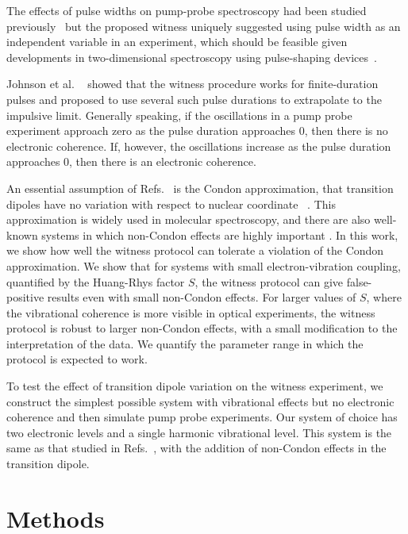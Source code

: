 The effects of pulse widths on pump-probe spectroscopy had been studied previously~\cite{pulseWidth} but the proposed witness uniquely suggested using pulse width as an independent variable in an experiment, which should be feasible given developments in two-dimensional spectroscopy using pulse-shaping devices~\cite{pulse1,pulse2}.

Johnson et al.  ~\cite{allanWitness} showed that the witness procedure works for finite-duration pulses and proposed to use several such pulse durations to extrapolate to the impulsive limit. Generally speaking, if the oscillations in a pump probe experiment approach zero as the pulse duration approaches 0, then there is no electronic coherence.  If, however, the oscillations increase as the pulse duration approaches 0, then there is an electronic coherence.

An essential assumption of Refs.~\cite{witness,allanWitness} is the Condon approximation, that transition dipoles have no variation with respect to nuclear coordinate ~\cite{Condon,FranckCondon}. This approximation is widely used in molecular spectroscopy, and there are also well-known systems in which non-Condon effects are highly important \cite{photosyntheticKappa,MavrosNonCondon,hellerGraphene,Hockett2011}. In this work, we show how well the witness protocol can tolerate a violation of the Condon approximation. We show that for systems with small electron-vibration coupling, quantified by the Huang-Rhys factor $S$, the witness protocol can give false-positive results even with small non-Condon effects. For larger values of $S$, where the vibrational coherence is more visible in optical experiments, the witness protocol is robust to larger non-Condon effects, with a small modification to the interpretation of the data. We quantify the parameter range in which the protocol is expected to work.


To test the effect of transition dipole variation on the witness experiment, we construct the simplest possible system with vibrational effects but no electronic coherence and then simulate pump probe experiments.  Our system of choice has two electronic levels and a single harmonic vibrational level. This system is the same as that studied in Refs.~\cite{witness,allanWitness}, with the addition of non-Condon effects in the transition dipole.

\section{Methods}

